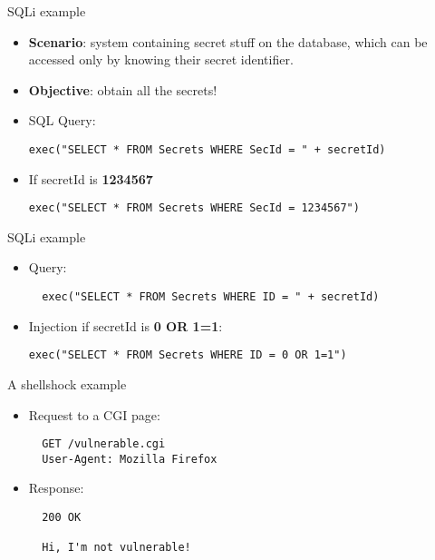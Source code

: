 \begin{frame}[fragile]{SQLi example}
  \begin{itemize}
    \item \textbf{Scenario}: system containing secret stuff on the database, which can be accessed only by knowing their secret identifier.
    \item \textbf{Objective}: obtain all the secrets!
    \item SQL Query:
\ccode
\begin{lstlisting}
exec("SELECT * FROM Secrets WHERE SecId = " + secretId)
\end{lstlisting}
\pause
    \item If secretId is \textbf{1234567}
\begin{lstlisting}
exec("SELECT * FROM Secrets WHERE SecId = 1234567")
\end{lstlisting}
  \end{itemize}

\end{frame}
\begin{frame}[fragile]{SQLi example}

\ccode
\begin{itemize}
  \item Query:
  \begin{lstlisting}
  exec("SELECT * FROM Secrets WHERE ID = " + secretId)
  \end{lstlisting}
\pause
  \item Injection if secretId is \textbf{0 OR 1=1}:
\begin{lstlisting}
exec("SELECT * FROM Secrets WHERE ID = 0 OR 1=1")
\end{lstlisting}
\end{itemize}
\end{frame}

\begin{frame}[fragile]{A shellshock example}
  \begin{itemize}
    \item Request to a CGI page:
  \begin{lstlisting}
  GET /vulnerable.cgi
  User-Agent: Mozilla Firefox
  \end{lstlisting}
\pause
    \item Response:
  \begin{lstlisting}
  200 OK

  Hi, I'm not vulnerable!
  \end{lstlisting}
  \end{itemize}

\end{frame}

